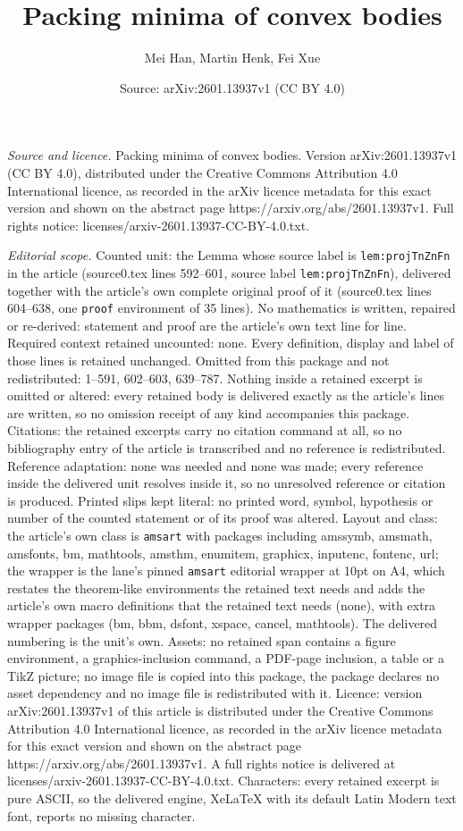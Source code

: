 \documentclass[10pt,a4paper]{amsart}
\title[Packing minima of convex bodies]{Packing minima of convex bodies}
\author{Mei Han, Martin Henk, Fei Xue}
\date{Source: arXiv:2601.13937v1 (CC BY 4.0)}
\begin{document}
\maketitle

\noindent\emph{Source and licence.} Packing minima of convex bodies. Version arXiv:2601.13937v1 (CC BY 4.0), distributed under the Creative Commons Attribution 4.0 International licence, as recorded in the arXiv licence metadata for this exact version and shown on the abstract page https://arxiv.org/abs/2601.13937v1. Full rights notice: licenses/arxiv-2601.13937-CC-BY-4.0.txt.\par\smallskip

\noindent\textit{Editorial scope.} Counted unit: the Lemma whose source label is \texttt{lem:projTnZnFn} in the article (source0.tex lines 592--601, source label \texttt{lem:projTnZnFn}), delivered together with the article's own complete original proof of it (source0.tex lines 604--638, one \texttt{proof} environment of 35 lines). No mathematics is written, repaired or re-derived: statement and proof are the article's own text line for line. Required context retained uncounted: none. Every definition, display and label of those lines is retained unchanged. Omitted from this package and not redistributed: 1--591, 602--603, 639--787. Nothing inside a retained excerpt is omitted or altered: every retained body is delivered exactly as the article's lines are written, so no omission receipt of any kind accompanies this package. Citations: the retained excerpts carry no citation command at all, so no bibliography entry of the article is transcribed and no reference is redistributed. Reference adaptation: none was needed and none was made; every reference inside the delivered unit resolves inside it, so no unresolved reference or citation is produced. Printed slips kept literal: no printed word, symbol, hypothesis or number of the counted statement or of its proof was altered. Layout and class: the article's own class is \texttt{amsart} with packages including amssymb, amsmath, amsfonts, bm, mathtools, amsthm, enumitem, graphicx, inputenc, fontenc, url; the wrapper is the lane's pinned \texttt{amsart} editorial wrapper at 10pt on A4, which restates the theorem-like environments the retained text needs and adds the article's own macro definitions that the retained text needs (none), with extra wrapper packages (bm, bbm, dsfont, xspace, cancel, mathtools). The delivered numbering is the unit's own. Assets: no retained span contains a figure environment, a graphics-inclusion command, a PDF-page inclusion, a table or a TikZ picture; no image file is copied into this package, the package declares no asset dependency and no image file is redistributed with it. Licence: version arXiv:2601.13937v1 of this article is distributed under the Creative Commons Attribution 4.0 International licence, as recorded in the arXiv licence metadata for this exact version and shown on the abstract page https://arxiv.org/abs/2601.13937v1. A full rights notice is delivered at licenses/arxiv-2601.13937-CC-BY-4.0.txt. Characters: every retained excerpt is pure ASCII, so the delivered engine, XeLaTeX with its default Latin Modern text font, reports no missing character.
\end{document}
